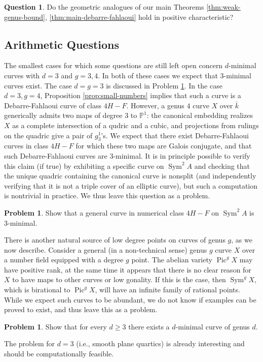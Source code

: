 \documentclass[11pt]{amsart}
\newcommand{\PP}{\mathbb{P}}
\newcommand{\kbar}{{\bar{k}}}
\DeclareMathOperator{\Pic}{Pic}
\DeclareMathOperator{\Sym}{Sym}
\theoremstyle{definition}
\newtheorem{question}[theorem]{Question}
\newtheorem{problem}[theorem]{Problem}
\theoremstyle{remark}
\begin{document}
\begin{question}
Do the geometric analogues of our main Theorems \ref{thm:weak-genus-bound}, \ref{thm:main-debarre-fahlaoui} hold in positive characteristic?
\end{question}

\subsection{Arithmetic Questions}\label{sec:arithmetic-questions}

The smallest cases for which some questions are still left open concern $d$-minimal curves with $d=3$ and $g=3,4$. In both of these cases we expect that $3$-minimal curves exist. The case $d=g=3$ is discussed in Problem \ref{d=g-minimal}. In the case $d=3, g=4$, Proposition \ref{prop:small-numbers} implies that such a curve is a Debarre-Fahlaoui curve of class $4H-F$. However, a genus $4$ curve $X$ over $\kbar$ generically admits two maps of degree $3$ to $\PP^1$: the canonical embedding realizes $X$ as a complete intersection of a qudric and a cubic, and projections from rulings on the quadric give a pair of $g^1_3$'s. We expect that there exist Debarre-Fahlaoui curves in class \(4H-F\) for which these two maps are Galois conjugate, and that such Debarre-Fahlaoui curves are $3$-minimal.
It is in principle possible to verify this claim (if true) by exhibiting a specific curve on $\Sym^2A$ and checking that the unique quadric containing the canonical curve is nonsplit (and independently verifying that it is not a triple cover of an elliptic curve), but such a computation is nontrivial in practice. We thus leave this question as a problem.

\begin{problem}
Show that a general curve in numerical class $4H-F$ on $\Sym^2 A$ is $3$-minimal.
\end{problem}

There is another natural source of low degree points on curves of genus $g$, as we now describe. Consider a general (in a non-technical sense) genus $g$ curve $X$ over a number field equipped with a degree $g$ point. The abelian variety $\Pic^g X$ may have positive rank, at the same time it appears that there is no clear reason for $X$ to have maps to other curves or low gonality. If this is the case, then $\Sym^g X$, which is birational to $\Pic^g X$, will have an infinite family of rational points. While we expect such curves to be abundant, we do not know if examples can be proved to exist, and thus leave this as a problem.
\begin{problem}\label{d=g-minimal}
Show that for every $d\geqslant 3$ there exists a $d$-minimal curve of genus $d.$
\end{problem}
The problem for $d=3$ (i.e., smooth plane quartics) is already interesting and should be computationally feasible. 
\medskip
\end{document}
